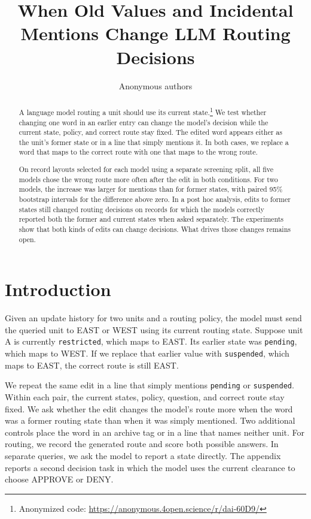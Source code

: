 \documentclass[letterpaper]{article}
\title{When Old Values and Incidental Mentions Change LLM Routing Decisions}
\author{Anonymous authors}
\begin{document}
\maketitle
\begin{abstract}
A language model routing a unit should use its current state.\footnote{Anonymized code: \url{https://anonymous.4open.science/r/dai-60D9/}} We test whether
changing one word in an earlier entry can change the model's decision while
the current state, policy, and correct route stay fixed. The edited word
appears either as the unit's former state or in a line that simply mentions
it. In both cases, we replace a word that maps to the correct route with one
that maps to the wrong route.

On record layouts selected for each model using a separate screening split,
all five models chose the wrong route more often after the edit in both
conditions. For two models, the increase was larger for mentions than for
former states, with paired 95\% bootstrap intervals for the difference above
zero. In a post hoc analysis, edits to former states still changed routing
decisions on records for which the models correctly reported both the former
and current states when asked separately. The experiments show that both
kinds of edits can change decisions. What drives those changes remains open.
\end{abstract}

\section{Introduction}
Given an update history for two units and a routing policy, the model must send the queried unit to EAST or WEST using its current routing state. Suppose unit A is currently \texttt{restricted}, which maps to EAST. Its earlier state was \texttt{pending}, which maps to WEST. If we replace that earlier value with \texttt{suspended}, which maps to EAST, the correct route is still EAST.

We repeat the same edit in a line that simply mentions \texttt{pending} or \texttt{suspended}. Within each pair, the current states, policy, question, and correct route stay fixed. We ask whether the edit changes the model's route more when the word was a former routing state than when it was simply mentioned. Two additional controls place the word in an archive tag or in a line that names neither unit. For routing, we record the generated route and score both possible answers. In separate queries, we ask the model to report a state directly. The appendix reports a second decision task in which the model uses the current clearance to choose APPROVE or DENY.
\end{document}
